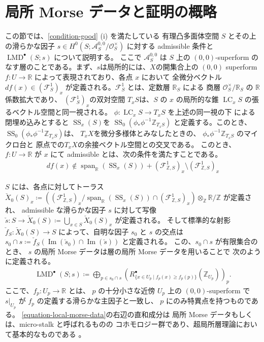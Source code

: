 \documentclass[a4paper,dvipdfmx,reqno,12pt]{amsart}
\theoremstyle{definition}
\newcommand{\deq}{\coloneqq}
\newcommand{\opn}[1]{\operatorname{#1}}
\numberwithin{equation}{section}
\begin{document}
\section{局所 Morse データと証明の概略}
この節では、\cref{condition-good} (i) を満たしている
有理凸多面体空間 $S$ とその上の滑らかな因子
$s\in H^{0}(S;\mathcal{A}_{S}^{0,0}/\mathcal{O}^{\times}_S)$
に対する admissible 条件と 
$\opn{LMD}^{\bullet}(S;s)$ について説明する。
ここで $\mathcal{A}^{0,0}_S$ は $S$ 上の $(0,0)$-superform
のなす層のことである\cite{MR3903579}。まず、$s$は局所的には、$X$の開集合上の 
$(0,0)$ superform $f\colon U\to \mathbb{R}$
によって表現されており、各点 $x$ において
全微分ベクトル $df(x)\in(\mathcal{F}_{S}^{1})_x$ 
が定義される。$\mathcal{F}_{S}^{1}$ とは、定数層
$\mathbb{R}_S$ による
商層 $\mathcal{O}^{\times}_{S}/\mathbb{R}_{S}$ 
の $\mathbb{R}$ 係数拡大であり、
$(\mathcal{F}_{S}^{1})_x$の双対空間
$T_x S$は、$S$ の $x$ の局所的な錐
$\opn{LC}_x S$ の張るベクトル空間と同一視される。
$\phi \colon \opn{LC}_x S\to T_x S$ を上述の同一視の下
による閉埋め込みとすると
$\opn{SS}_x (S)$を
$\opn{SS}_0(\phi_* \phi^{-1}\mathbb{Z}_{T_x S})$
と定義する。このとき、
$\opn{SS}_0(\phi_* \phi^{-1}\mathbb{Z}_{T_x S})$は、
$T_x X$を微分多様体とみなしたときの、
$\phi_* \phi^{-1}\mathbb{Z}_{T_x S}$ のマイクロ台と
原点での$T_x X$の余接ベクトル空間との交叉である。
このとき、
$f\colon U \to \mathbb{R}$ が $x$ にて admissible 
とは、次の条件を満たすことである。
\begin{align}
df(x)\notin\opn{span}_{\mathbb{R}}(\opn{SS}_x(S))+
(\mathcal{F}_{\mathbb{Z},S}^{1})_x 
\setminus (\mathcal{F}_{\mathbb{Z},S}^{1})_x
\end{align}

$S$ には、各点に対してトーラス
$\check{X}_0(S)_x\deq ((\mathcal{F}^{1}_{\mathbb{Z},S})_x/
\opn{span}_{\mathbb{R}}(\opn{SS}_x(S))\cap 
(\mathcal{F}^{1}_{\mathbb{Z},S})_x)\otimes_{\mathbb{Z}}
\mathbb{R}/\mathbb{Z}$ が定義され、
admissible な滑らかな因子 $s$ に対して写像
$\check{s}\colon S\to \check{X}_0(S)\deq 
\bigcup_{x\in S} \check{X}_0(S)_x$ が定義される。 
そして標準的な射影 $\check{f}_{S}\colon \check{X}_0(S)\to S$
によって、自明な因子 $s_0$ と $s$ の交点は
$s_0\cap s\deq \check{f}_{S}(\opn{Im}(\check{s}_0)\cap 
\opn{Im}(\check{s}))$ と定義される。
この、$s_0\cap s$ が有限集合のとき、
$s$ の局所 Morse データは層の局所 Morse データを用いることで
次のように定義される。
\begin{align} \label{equation-local-morse-data}
\opn{LMD}^{\bullet}(S;s)\deq 
\bigoplus_{p\in s_0\cap s} 
(R^{\bullet}_{\{x\in U_p\mid f_p(x)\geq f_p(p)\}}(\mathbb{Z}_{U_p}))_p.
\end{align}
ここで、$f_p\colon U_p\to \mathbb{R}$ とは、
$p$ の十分小さな近傍 $U_p$ 上の $(0,0)$-superform で
$s|_{U_p}$ が $f_p$ の定義する滑らかな主因子と一致し、
$p$ にのみ特異点を持つものである。 
\cref{equation-local-morse-data}の右辺の直和成分は
局所 Morse データもしくは、micro-stalk と呼ばれるものの
コホモロジー群であり、超局所層理論において基本的なものである
\cite{MR2031639,MR1299726}。
\end{document}
